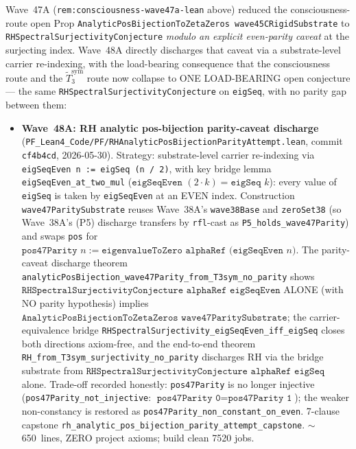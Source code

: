 \begin{remark}\label{rem:consciousness-wave48a-lean}
Wave~47A (\texttt{rem:consciousness-wave47a-lean} above) reduced the consciousness-route open Prop \texttt{AnalyticPosBijectionToZetaZeros wave45CRigidSubstrate} to \texttt{RHSpectralSurjectivityConjecture} \emph{modulo an explicit even-parity caveat} at the surjecting index. Wave~48A directly discharges that caveat via a substrate-level carrier re-indexing, with the load-bearing consequence that the consciousness route and the $\widetilde{T}_3^{\mathrm{sym}}$ route now collapse to ONE LOAD-BEARING open conjecture --- the same \texttt{RHSpectralSurjectivityConjecture} on \texttt{eigSeq}, with no parity gap between them:
\begin{itemize}
  \item \textbf{Wave~48A: RH analytic pos-bijection parity-caveat discharge} (\texttt{PF\_Lean4\_Code/PF/RHAnalyticPosBijectionParityAttempt.lean}, commit \texttt{cf4b4cd}, 2026-05-30). Strategy: substrate-level carrier re-indexing via \texttt{eigSeqEven n := eigSeq (n / 2)}, with key bridge lemma \texttt{eigSeqEven\_at\_two\_mul} ($\texttt{eigSeqEven } (2\cdot k) = \texttt{eigSeq } k$): every value of \texttt{eigSeq} is taken by \texttt{eigSeqEven} at an EVEN index. Construction \texttt{wave47ParitySubstrate} reuses Wave~38A's \texttt{wave38Base} and \texttt{zeroSet38} (so Wave~38A's (P5) discharge transfers by \texttt{rfl}-cast as \texttt{P5\_holds\_wave47Parity}) and swaps \texttt{pos} for $\texttt{pos47Parity } n := \texttt{eigenvalueToZero alphaRef (eigSeqEven } n\texttt{)}$. The parity-caveat discharge theorem \texttt{analyticPosBijection\_wave47Parity\_from\_T3sym\_no\_parity} shows $\texttt{RHSpectralSurjectivityConjecture alphaRef eigSeqEven}$ ALONE (with NO parity hypothesis) implies $\texttt{AnalyticPosBijectionToZetaZeros wave47ParitySubstrate}$; the carrier-equivalence bridge \texttt{RHSpectralSurjectivity\_eigSeqEven\_iff\_eigSeq} closes both directions axiom-free, and the end-to-end theorem \texttt{RH\_from\_T3sym\_surjectivity\_no\_parity} discharges RH via the bridge substrate from $\texttt{RHSpectralSurjectivityConjecture alphaRef eigSeq}$ alone. Trade-off recorded honestly: \texttt{pos47Parity} is no longer injective (\texttt{pos47Parity\_not\_injective}: $\texttt{pos47Parity 0} = \texttt{pos47Parity 1}$); the weaker non-constancy is restored as \texttt{pos47Parity\_non\_constant\_on\_even}. 7-clause capstone \texttt{rh\_analytic\_pos\_bijection\_parity\_attempt\_capstone}. $\sim$650~lines, ZERO project axioms; build clean 7520 jobs.

\end{itemize}
\end{remark}
